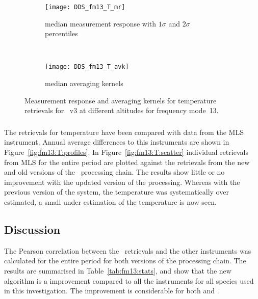 \begin{figure}[htpb]
    \centering
    \begin{subfigure}[b]{0.49\textwidth}
        \texttt{[image: DDS\_fm13\_T\_mr]}
        \caption{median measurement response with $1\sigma$ and $2\sigma$
        percentiles}
        \label{fig:fm13:T:mr}
    \end{subfigure}
    \,
    \begin{subfigure}[b]{0.49\textwidth}
        \texttt{[image: DDS\_fm13\_T\_avk]}
        \caption{median averaging kernels}
        \label{fig:fm13:T:avk}
    \end{subfigure}
    \caption{Measurement response and averaging kernels for temperature
    retrievals for \smr~v3 at different altitudes for frequency mode~13.}
    \label{fig:fm13:T:mr_avk}
\end{figure}

\subsubsection{}
\label{sec:fm13:comparison:temperature}
The retrievals for temperature have been compared with data from the MLS
instrument. Annual average differences to this instruments are shown in
Figure~\ref{fig:fm13:T:profiles}. In Figure~\ref{fig:fm13:T:scatter} individual
retrievals from MLS for the entire period are plotted against the retrievals
from the new and old versions of the \smr\ processing chain. The results show
little or no improvement with the updated version of the processing. Whereas
with the previous version of the system, the temperature was systematically
over estimated, a small under estimation of the temperature is now seen.


\subsection{Discussion}
\label{sec:fm13:discussion}
The Pearson correlation between the \smr\ retrievals and the other instruments
was calculated for the entire period for both versions of the processing chain.
The results are summarised in Table~\ref{tab:fm13:stats}, and show that the
new algorithm is a improvement compared to all the instruments for all species
used in this investigation. The improvement is considerable for both 
and .


